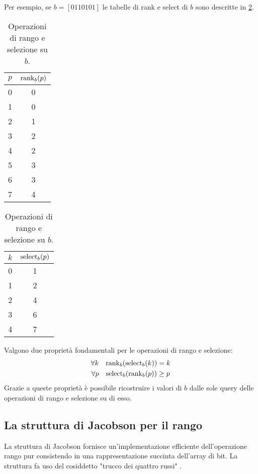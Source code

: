 Per esempio, se $b = [0 1 1 0 1 0 1]$ le tabelle di rank e select di $b$ sono descritte in \cref{table:rank_sel}.
\begin{table}[ht]
	\centering
	\begin{subtable}{0.45\textwidth}
		\centering
		\begin{tabular}{c|c}
			$p$ & $\rank_b(p)$ \\ \hline
			0   & 0            \\
			1   & 0            \\
			2   & 1            \\
			3   & 2            \\
			4   & 2            \\
			5   & 3            \\
			6   & 3            \\
			7   & 4
		\end{tabular}
		\caption{$\rank_b(p)$}
	\end{subtable}
	\begin{subtable}{0.45\textwidth}
		\centering
		\begin{tabular}{c|c}
			$k$ & $\select_b(p)$ \\ \hline
			0   & 1              \\
			1   & 2              \\
			2   & 4              \\
			3   & 6              \\
			4   & 7
		\end{tabular}
		\caption{$\select_b(p)$}
	\end{subtable}
	\caption{Operazioni di rango e selezione su $b$.}
	\label{table:rank_sel}
\end{table}

Valgono due proprietà fondamentali per le operazioni di rango e selezione:
\begin{gather*}
	\forall k\quad \mathrm{rank}_b(\mathrm{select}_b(k)) = k \\
	\forall p\quad \mathrm{select}_b(\mathrm{rank}_b(p)) \geq p
\end{gather*}
Grazie a queste proprietà è possibile ricostruire i valori di $b$ dalle sole query delle operazioni di rango e selezione su di esso.


\subsection{La struttura di Jacobson per il rango}
La struttura di Jacobson fornisce un'implementazione efficiente dell'operazione rango pur consistendo in una rappresentazione succinta dell'array di bit.
La struttura fa uso del cosiddetto "trucco dei quattro russi" \cite{Arlazarov:70:fourrussians}.

